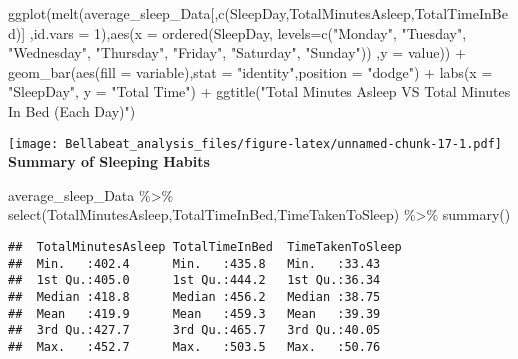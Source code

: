 \documentclass[
]{article}
\newenvironment{Shaded}{\begin{snugshade}}{\end{snugshade}}
\newcommand{\AttributeTok}[1]{\textcolor[rgb]{0.77,0.63,0.00}{#1}}
\newcommand{\DecValTok}[1]{\textcolor[rgb]{0.00,0.00,0.81}{#1}}
\newcommand{\FunctionTok}[1]{\textcolor[rgb]{0.00,0.00,0.00}{#1}}
\newcommand{\NormalTok}[1]{#1}
\newcommand{\SpecialCharTok}[1]{\textcolor[rgb]{0.00,0.00,0.00}{#1}}
\newcommand{\StringTok}[1]{\textcolor[rgb]{0.31,0.60,0.02}{#1}}
\begin{document}
\begin{Shaded}
\begin{Highlighting}[]
\FunctionTok{ggplot}\NormalTok{(}\FunctionTok{melt}\NormalTok{(average\_sleep\_Data[,}\FunctionTok{c}\NormalTok{(}\StringTok{\textquotesingle{}SleepDay\textquotesingle{}}\NormalTok{,}\StringTok{\textquotesingle{}TotalMinutesAsleep\textquotesingle{}}\NormalTok{,}\StringTok{\textquotesingle{}TotalTimeInBed\textquotesingle{}}\NormalTok{)]}
\NormalTok{            ,}\AttributeTok{id.vars =} \DecValTok{1}\NormalTok{),}\FunctionTok{aes}\NormalTok{(}\AttributeTok{x =} \FunctionTok{ordered}\NormalTok{(SleepDay, }
                                   \AttributeTok{levels=}\FunctionTok{c}\NormalTok{(}\StringTok{"Monday"}\NormalTok{, }\StringTok{"Tuesday"}\NormalTok{, }\StringTok{"Wednesday"}\NormalTok{, }\StringTok{"Thursday"}\NormalTok{,}
                                            \StringTok{"Friday"}\NormalTok{, }\StringTok{"Saturday"}\NormalTok{, }\StringTok{"Sunday"}\NormalTok{))}
\NormalTok{                       ,}\AttributeTok{y =}\NormalTok{ value)) }\SpecialCharTok{+} 
  \FunctionTok{geom\_bar}\NormalTok{(}\FunctionTok{aes}\NormalTok{(}\AttributeTok{fill =}\NormalTok{ variable),}\AttributeTok{stat =} \StringTok{"identity"}\NormalTok{,}\AttributeTok{position =} \StringTok{"dodge"}\NormalTok{) }\SpecialCharTok{+}
  \FunctionTok{labs}\NormalTok{(}\AttributeTok{x =} \StringTok{"SleepDay"}\NormalTok{, }\AttributeTok{y =} \StringTok{"Total Time"}\NormalTok{) }\SpecialCharTok{+}
  \FunctionTok{ggtitle}\NormalTok{(}\StringTok{"Total Minutes Asleep VS Total Minutes In Bed (Each Day)"}\NormalTok{)}
\end{Highlighting}
\end{Shaded}

\texttt{[image: Bellabeat\_analysis\_files/figure-latex/unnamed-chunk-17-1.pdf]}\\
\textbf{Summary of Sleeping Habits}

\begin{Shaded}
\begin{Highlighting}[]
\NormalTok{average\_sleep\_Data }\SpecialCharTok{\%\textgreater{}\%} 
  \FunctionTok{select}\NormalTok{(TotalMinutesAsleep,TotalTimeInBed,TimeTakenToSleep) }\SpecialCharTok{\%\textgreater{}\%} 
  \FunctionTok{summary}\NormalTok{()}
\end{Highlighting}
\end{Shaded}

\begin{verbatim}
##  TotalMinutesAsleep TotalTimeInBed  TimeTakenToSleep
##  Min.   :402.4      Min.   :435.8   Min.   :33.43   
##  1st Qu.:405.0      1st Qu.:444.2   1st Qu.:36.34   
##  Median :418.8      Median :456.2   Median :38.75   
##  Mean   :419.9      Mean   :459.3   Mean   :39.39   
##  3rd Qu.:427.7      3rd Qu.:465.7   3rd Qu.:40.05   
##  Max.   :452.7      Max.   :503.5   Max.   :50.76
\end{verbatim}
\end{document}
